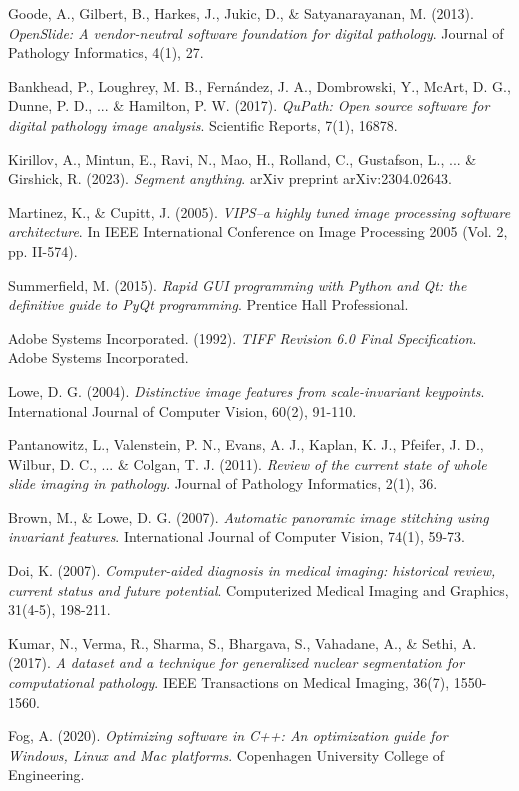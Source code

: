 \documentclass[11pt,a4paper]{report}
\begin{document}
\begin{thebibliography}{20}

Goode, A., Gilbert, B., Harkes, J., Jukic, D., \& Satyanarayanan, M. (2013). 
\textit{OpenSlide: A vendor-neutral software foundation for digital pathology}. 
Journal of Pathology Informatics, 4(1), 27.

Bankhead, P., Loughrey, M. B., Fernández, J. A., Dombrowski, Y., McArt, D. G., Dunne, P. D., ... \& Hamilton, P. W. (2017). 
\textit{QuPath: Open source software for digital pathology image analysis}. 
Scientific Reports, 7(1), 16878.

Kirillov, A., Mintun, E., Ravi, N., Mao, H., Rolland, C., Gustafson, L., ... \& Girshick, R. (2023). 
\textit{Segment anything}. 
arXiv preprint arXiv:2304.02643.

Martinez, K., \& Cupitt, J. (2005). 
\textit{VIPS–a highly tuned image processing software architecture}. 
In IEEE International Conference on Image Processing 2005 (Vol. 2, pp. II-574).

Summerfield, M. (2015). 
\textit{Rapid GUI programming with Python and Qt: the definitive guide to PyQt programming}. 
Prentice Hall Professional.

Adobe Systems Incorporated. (1992). 
\textit{TIFF Revision 6.0 Final Specification}. 
Adobe Systems Incorporated.

Lowe, D. G. (2004). 
\textit{Distinctive image features from scale-invariant keypoints}. 
International Journal of Computer Vision, 60(2), 91-110.

Pantanowitz, L., Valenstein, P. N., Evans, A. J., Kaplan, K. J., Pfeifer, J. D., Wilbur, D. C., ... \& Colgan, T. J. (2011). 
\textit{Review of the current state of whole slide imaging in pathology}. 
Journal of Pathology Informatics, 2(1), 36.

Brown, M., \& Lowe, D. G. (2007). 
\textit{Automatic panoramic image stitching using invariant features}. 
International Journal of Computer Vision, 74(1), 59-73.

Doi, K. (2007). 
\textit{Computer-aided diagnosis in medical imaging: historical review, current status and future potential}. 
Computerized Medical Imaging and Graphics, 31(4-5), 198-211.

Kumar, N., Verma, R., Sharma, S., Bhargava, S., Vahadane, A., \& Sethi, A. (2017). 
\textit{A dataset and a technique for generalized nuclear segmentation for computational pathology}. 
IEEE Transactions on Medical Imaging, 36(7), 1550-1560.

Fog, A. (2020). 
\textit{Optimizing software in C++: An optimization guide for Windows, Linux and Mac platforms}. 
Copenhagen University College of Engineering.

\end{thebibliography}
\end{document}
